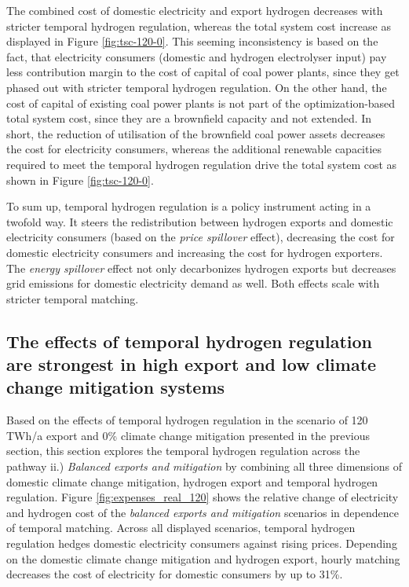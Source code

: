The combined cost of domestic electricity and export hydrogen decreases with stricter temporal hydrogen regulation, whereas the total system cost increase as displayed in Figure \ref{fig:tsc-120-0}. This seeming inconsistency is based on the fact, that electricity consumers (domestic and hydrogen electrolyser input) pay less contribution margin to the cost of capital of coal power plants, since they get phased out with stricter temporal hydrogen regulation. On the other hand, the cost of capital of existing coal power plants is not part of the optimization-based total system cost, since they are a brownfield capacity and not extended. In short, the reduction of utilisation of the brownfield coal power assets decreases the cost for electricity consumers, whereas the additional renewable capacities required to meet the temporal hydrogen regulation drive the total system cost as shown in Figure \ref{fig:tsc-120-0}. 


To sum up, temporal hydrogen regulation is a policy instrument acting in a twofold way. It steers the redistribution between hydrogen exports and domestic electricity consumers (based on the \textit{price spillover} effect), decreasing the cost for domestic electricity consumers and increasing the cost for hydrogen exporters. The \textit{energy spillover} effect not only decarbonizes hydrogen exports but decreases grid emissions for  domestic electricity demand as well. Both effects scale with stricter temporal matching.



\subsection*{The effects of temporal hydrogen regulation are strongest in high export and low climate change mitigation systems}
\label{subsec:rule_all}

Based on the effects of temporal hydrogen regulation in the scenario of 120 TWh/a export and 0\% climate change mitigation presented in the previous section, this section explores the temporal hydrogen regulation across the pathway ii.) \textit{Balanced exports and mitigation} by combining all three dimensions of domestic climate change mitigation, hydrogen export and temporal hydrogen regulation. Figure \ref{fig:expenses_real_120} shows the relative change of electricity and hydrogen cost of the \textit{balanced exports and mitigation} scenarios in dependence of temporal matching. 
Across all displayed scenarios, temporal hydrogen regulation hedges domestic electricity consumers against rising prices. Depending on the domestic climate change mitigation and hydrogen export, hourly matching decreases the cost of electricity for domestic consumers by up to 31\%.


